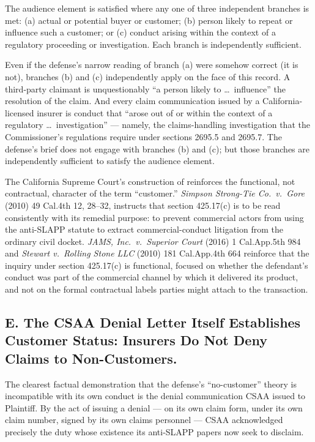 The audience element is satisfied where any one of three independent branches is met: (a) actual or potential buyer or customer; (b) person likely to repeat or influence such a customer; or (c) conduct arising within the context of a regulatory proceeding or investigation. Each branch is independently sufficient.

Even if the defense's narrow reading of branch (a) were somehow correct (it is not), branches (b) and (c) independently apply on the face of this record. A third-party claimant is unquestionably ``a person likely to \dots~influence'' the resolution of the claim. And every claim communication issued by a California-licensed insurer is conduct that ``arose out of or within the context of a regulatory \dots~investigation'' --- namely, the claims-handling investigation that the Commissioner's regulations require under sections 2695.5 and 2695.7. The defense's brief does not engage with branches (b) and (c); but those branches are independently sufficient to satisfy the audience element.

The California Supreme Court's construction of  reinforces the functional, not contractual, character of the term ``customer.'' \textit{Simpson Strong-Tie Co.\ v.\ Gore} (2010) 49 Cal.4th 12, 28--32, instructs that section 425.17(c) is to be read consistently with its remedial purpose: to prevent commercial actors from using the anti-SLAPP statute to extract commercial-conduct litigation from the ordinary civil docket. \textit{JAMS, Inc.\ v.\ Superior Court} (2016) 1 Cal.App.5th 984 and \textit{Stewart v.\ Rolling Stone LLC} (2010) 181 Cal.App.4th 664 reinforce that the inquiry under section 425.17(c) is functional, focused on whether the defendant's conduct was part of the commercial channel by which it delivered its product, and not on the formal contractual labels parties might attach to the transaction.

\subsection*{E. The CSAA Denial Letter Itself Establishes Customer Status: Insurers Do Not Deny Claims to Non-Customers.}

The clearest factual demonstration that the defense's ``no-customer'' theory is incompatible with its own conduct is the denial communication CSAA issued to Plaintiff. By the act of issuing a denial --- on its own claim form, under its own claim number, signed by its own claims personnel --- CSAA acknowledged precisely the duty whose existence its anti-SLAPP papers now seek to disclaim.


